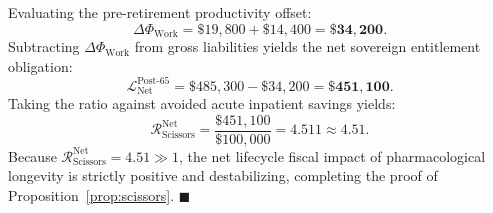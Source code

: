 \documentclass[11pt,a4paper]{article}
\begin{document}
Evaluating the pre-retirement productivity offset:
\begin{equation}
    \Delta\Phi_{\text{Work}} = \$19,800 + \$14,400 = \mathbf{\$34,200}.
\end{equation}
Subtracting $\Delta\Phi_{\text{Work}}$ from gross liabilities yields the net sovereign entitlement obligation:
\begin{equation}
    \mathcal{L}_{\text{Net}}^{\text{Post-65}} = \$485,300 - \$34,200 = \mathbf{\$451,100}.
\end{equation}
Taking the ratio against avoided acute inpatient savings yields:
\begin{equation}
    \mathcal{R}_{\text{Scissors}}^{\text{Net}} = \frac{\$451,100}{\$100,000} = \mathbf{4.511 \approx 4.51}.
\end{equation}
Because $\mathcal{R}_{\text{Scissors}}^{\text{Net}} = 4.51 \gg 1$, the net lifecycle fiscal impact of pharmacological longevity is strictly positive and destabilizing, completing the proof of Proposition~\ref{prop:scissors}. \hfill $\blacksquare$
\end{document}
